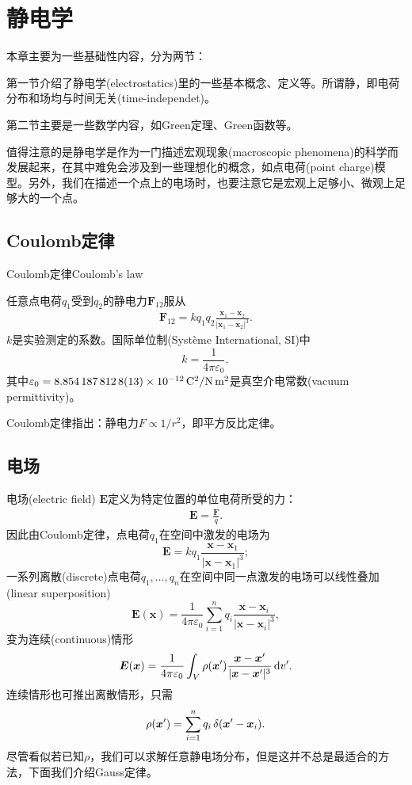 \section{静电学}
\label{sec:electrostatics}
本章主要为一些基础性内容，分为两节：
\begin{compactenum}
    \item 第一节介绍了静电学(electrostatics)里的一些基本概念、定义等。所谓静，即电荷分布和场均与时间无关(time-independet)。
    \item 第二节主要是一些数学内容，如Green定理、Green函数等。
\end{compactenum}
值得注意的是静电学是作为一门描述宏观现象(macroscopic phenomena)的科学而发展起来，在其中难免会涉及到一些理想化的概念，如点电荷(point charge)模型。另外，我们在描述一个点上的电场时，也要注意它是宏观上足够小、微观上足够大的一个点。
\subsection{Coulomb定律}
\begin{theorem}{Coulomb定律}{Coulomb's law}

    任意点电荷$q_1$受到$q_2$的静电力$\bm F_{12}$服从
    \begin{align}
        \label{eqn:Coulomb law}
        \bm F_{12}=kq_1q_2\frac{\bm x_1-\bm x_2}{|\bm x_1-\bm x_2|^3}.%
    \end{align}
    $k$是实验测定的系数。国际单位制(Syst\`eme International, SI)中
    \[
        k=\frac1{4\pi\varepsilon_0},
    \]
    其中$\varepsilon_0=\SI{8.8541878128(13)E-12}{C^2/N.m^2}$是真空介电常数(vacuum permittivity)。
\end{theorem}
Coulomb定律指出：静电力$F\propto 1/r^2$，即平方反比定律。
\subsection{电场}
电场(electric field) $\bm E$定义为特定位置的单位电荷所受的力：
\begin{align}
    \bm E=\frac{\bm F}q.%
\end{align}
因此由Coulomb定律，点电荷$q_1$在空间中激发的电场为
\begin{equation}
    \label{eqn:E of q}
    \bm E=kq_1\frac{\bm x-\bm x_1}{|\bm x-\bm x_1|^3};
\end{equation}
一系列离散(discrete)点电荷$q_1,\ldots,q_n$在空间中同一点激发的电场可以线性叠加(linear superposition)
\[
    \bm E(\bm x)=\frac1{4\pi\varepsilon_0}\sum_{i=1}^nq_i\frac{\bm x-\bm x_i}{|\bm x-\bm x_i|^3},
\]
变为连续(continuous)情形
\begin{align}
    \label{eqn:E(x)}
    \bm E(\bm x)=\frac1{4\pi\varepsilon_0}\int_V\rho(\bm x')\frac{\bm x-\bm x'}{|\bm x-\bm x'|^3}\mathop{}\!\mathrm{d} v'.
\end{align}
连续情形也可推出离散情形，只需
\[
    \rho(\bm x')=\sum_{i=1}^nq_i\mathop{}\!\delta(\bm x'-\bm x_i).
\]
尽管看似若已知$\rho$，我们可以求解任意静电场分布，但是这并不总是最适合的方法，下面我们介绍Gauss定律。
